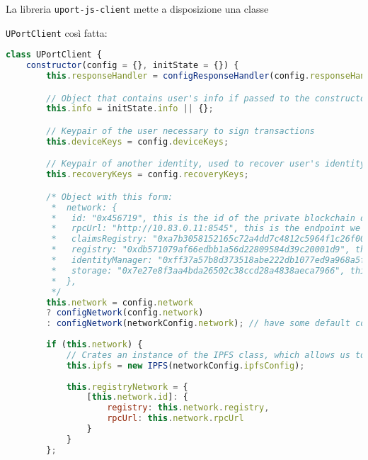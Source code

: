 La libreria \texttt{uport-js-client} mette a disposizione una classe

\texttt{UPortClient} così fatta:

\begin{lstlisting}[language=JavaScript]
class UPortClient {
    constructor(config = {}, initState = {}) {
        this.responseHandler = configResponseHandler(config.responseHandler);

        // Object that contains user's info if passed to the constructor, else empty object
        this.info = initState.info || {};

        // Keypair of the user necessary to sign transactions
        this.deviceKeys = config.deviceKeys;

        // Keypair of another identity, used to recover user's identity (Not used in BLINC as for now Identities are saved on a DB)
        this.recoveryKeys = config.recoveryKeys;

        /* Object with this form:
         *  network: {
         *   id: "0x456719", this is the id of the private blockchain deployed for BLINC
         *   rpcUrl: "http://10.83.0.11:8545", this is the endpoint we connect to in order to communicate with the blockchain via EthJS, a JavaScript library
         *   claimsRegistry: "0xa7b3058152165c72a4dd7c4812c5964f1c26f00d", this is the address of the EthereumClaimsRegistry contract on BLINC's private chain
         *   registry: "0xdb571079af66edbb1a56d22809584d39c20001d9", this is the address of the UportRegistry contract on BLINC's private chain
         *   identityManager: "0xff37a57b8d373518abe222db1077ed9a968a5fdf", this is the address of the IdentityManager contract on BLINC's private chain
         *   storage: "0x7e27e8f3aa4bda26502c38ccd28a4838aeca7966", this is the address of the smart contract that stores the IPFS hashes of user's documents
         *  },
         */
        this.network = config.network
        ? configNetwork(config.network)
        : configNetwork(networkConfig.network); // have some default connect/setup testrpc
    
        if (this.network) {
            // Crates an instance of the IPFS class, which allows us to communicate with the IPFS node specified in the configuration
            this.ipfs = new IPFS(networkConfig.ipfsConfig);
        
            this.registryNetwork = {
                [this.network.id]: {
                    registry: this.network.registry,
                    rpcUrl: this.network.rpcUrl
                }
            }
        };
    

\end{lstlisting}

